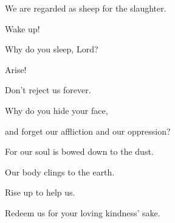 {\par }{\QB We are regarded as sheep for the slaughter.
\par }{\Q {}Wake up!
\par }{\QB Why do you sleep, Lord?
\par }{\Q Arise!
\par }{\QB Don’t reject us forever.
\par }{\Q {}Why do you hide your face,
\par }{\QB and forget our affliction and our oppression?
\par }{\Q {}For our soul is bowed down to the dust.
\par }{\QB Our body clings to the earth.
\par }{\Q {}Rise up to help us.
\par }{\QB Redeem us for your loving kindness’ sake.

}

